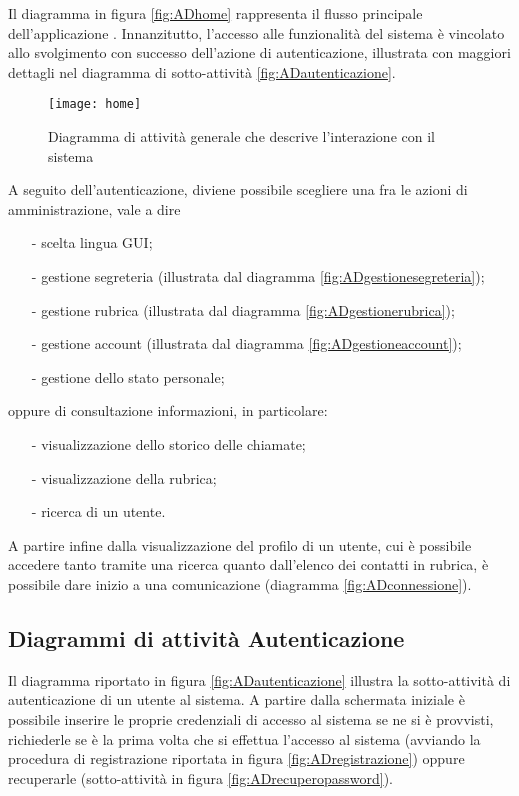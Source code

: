 Il diagramma in figura \vref{fig:ADhome} rappresenta il flusso principale dell'applicazione \caName. Innanzitutto, l'accesso alle funzionalità del sistema è vincolato allo svolgimento con successo dell'azione di autenticazione, illustrata con maggiori dettagli nel diagramma di sotto-attività \vref{fig:ADautenticazione}.

\begin{figure}[H]
\centering
\texttt{[image: home]}
\caption{Diagramma di attività generale che descrive l'interazione con il sistema}\label{fig:ADhome}
\end{figure}

A seguito dell'autenticazione, diviene possibile scegliere una fra le azioni di amministrazione, vale a dire
\begin{itemize}[noitemsep,nolistsep]
  \item[-] scelta lingua GUI;
  \item[-] gestione segreteria (illustrata dal diagramma \ref{fig:ADgestionesegreteria});
  \item[-] gestione rubrica (illustrata dal diagramma \ref{fig:ADgestionerubrica});
  \item[-] gestione account (illustrata dal diagramma \ref{fig:ADgestioneaccount});
  \item[-] gestione dello stato personale;
\end{itemize}
oppure di consultazione informazioni, in particolare:
\begin{itemize}[noitemsep,nolistsep]
  \item[-] visualizzazione dello storico delle chiamate;
  \item[-] visualizzazione della rubrica;
  \item[-] ricerca di un utente.
\end{itemize}

A partire infine dalla visualizzazione del profilo di un utente, cui è possibile accedere tanto tramite una ricerca quanto dall'elenco dei contatti in rubrica, è possibile dare inizio a una comunicazione (diagramma \vref{fig:ADconnessione}).

\subsection{Diagrammi di attività Autenticazione}
Il diagramma riportato in figura \vref{fig:ADautenticazione} illustra la sotto-attività di autenticazione di un utente al sistema. A partire dalla schermata iniziale è possibile inserire le proprie credenziali di accesso al sistema se ne si è provvisti, richiederle se è la prima volta che si effettua l'accesso al sistema (avviando la procedura di registrazione riportata in figura \ref{fig:ADregistrazione}) oppure recuperarle (sotto-attività in figura \vref{fig:ADrecuperopassword}).

